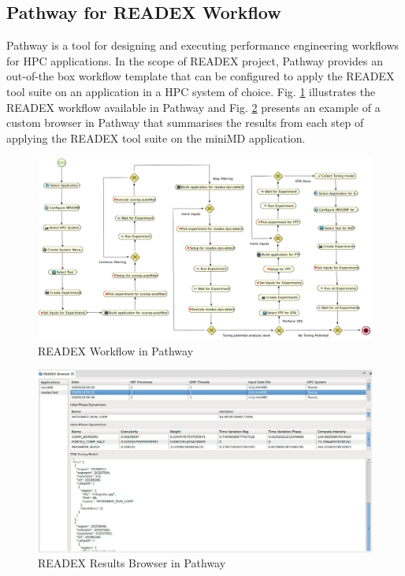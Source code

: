 \subsection{Pathway for READEX Workflow}
\label{sec:pathway_for_readex_workflow}
Pathway \cite{Pathway:Petkov13} is a tool for designing and executing performance engineering workflows for HPC applications. In the scope of READEX project, Pathway provides an out-of-the box workflow template that can be configured to apply the READEX tool suite on an application in a HPC system of choice. Fig. \ref{fig:pathway_workflow} illustrates the READEX workflow available in Pathway and Fig. \ref{fig:pathway_browser} presents an example of a custom browser in Pathway that summarises the results from each step of applying the READEX tool suite on the miniMD application.

\begin{figure}[!t]
\centering
\includegraphics[width=.95\columnwidth]{figures/PathwayWorkflow.png}
\caption{READEX Workflow in Pathway}
\label{fig:pathway_workflow}
\end{figure}

\begin{figure}[!t]
\centering
\includegraphics[width=.95\columnwidth]{figures/PathwayBrowser.jpeg}
\caption{READEX Results Browser in Pathway}
\label{fig:pathway_browser}
\end{figure}
